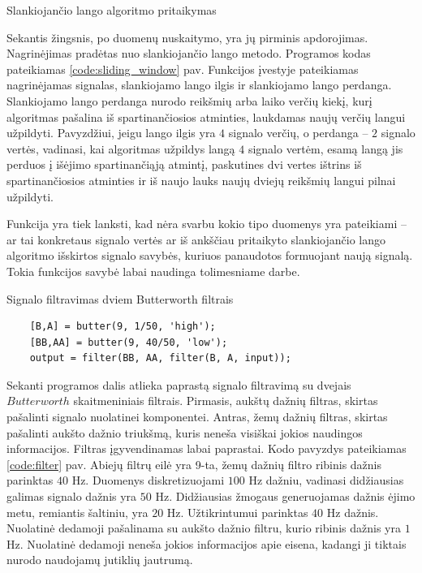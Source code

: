 \documentclass[]{vgtuef}
\begin{document}
\begin{cfigure}
  \centering
  \caption{Slankiojančio lango algoritmo pritaikymas}
  \label{code:sliding_window}
  
\end{cfigure}

Sekantis žingsnis, po duomenų nuskaitymo, yra jų pirminis apdorojimas. Nagrinėjimas pradėtas nuo slankiojančio lango metodo. Programos kodas pateikiamas \ref{code:sliding_window} pav. Funkcijos įvestyje pateikiamas nagrinėjamas signalas, slankiojamo lango ilgis ir slankiojamo lango perdanga. Slankiojamo lango perdanga nurodo reikšmių arba laiko verčių kiekį, kurį algoritmas pašalina iš spartinančiosios atminties, laukdamas naujų verčių langui užpildyti. Pavyzdžiui, jeigu lango ilgis yra $4$ signalo verčių, o perdanga -- $2$ signalo vertės, vadinasi, kai algoritmas užpildys langą $4$ signalo vertėm, esamą langą jis perduos į išėjimo spartinančiąją atmintį, paskutines dvi vertes ištrins iš spartinančiosios atminties ir iš naujo lauks naujų dviejų reikšmių langui pilnai užpildyti.

Funkcija yra tiek lanksti, kad nėra svarbu kokio tipo duomenys yra pateikiami -- ar tai konkretaus signalo vertės ar iš ankščiau pritaikyto slankiojančio lango algoritmo išskirtos signalo savybės, kuriuos panaudotos formuojant naują signalą. Tokia funkcijos savybė labai naudinga tolimesniame darbe.

\begin{cfigure}
  \centering
  \caption{Signalo filtravimas dviem Butterworth filtrais}
  \label{code:filter}
  \begin{lstlisting}
    [B,A] = butter(9, 1/50, 'high');
    [BB,AA] = butter(9, 40/50, 'low');
    output = filter(BB, AA, filter(B, A, input));
  \end{lstlisting}
\end{cfigure}

Sekanti programos dalis atlieka paprastą signalo filtravimą su dvejais $Butterworth$ skaitmeniniais filtrais. Pirmasis, aukštų dažnių filtras, skirtas pašalinti signalo nuolatinei komponentei. Antras, žemų dažnių filtras, skirtas pašalinti aukšto dažnio triukšmą, kuris neneša visiškai jokios naudingos informacijos. Filtras įgyvendinamas labai paprastai. Kodo pavyzdys pateikiamas \ref{code:filter} pav. Abiejų filtrų eilė yra 9-ta, žemų dažnių filtro ribinis dažnis parinktas $40$ Hz. Duomenys diskretizuojami $100$ Hz dažniu, vadinasi didžiausias galimas signalo dažnis yra $50$ Hz. Didžiausias žmogaus generuojamas dažnis ėjimo metu, remiantis šaltiniu, yra $20$ Hz. Užtikrintumui parinktas $40$ Hz dažnis. Nuolatinė dedamoji pašalinama su aukšto dažnio filtru, kurio ribinis dažnis yra $1$ Hz. Nuolatinė dedamoji neneša jokios informacijos apie eisena, kadangi ji tiktais nurodo naudojamų jutiklių jautrumą.
\end{document}

